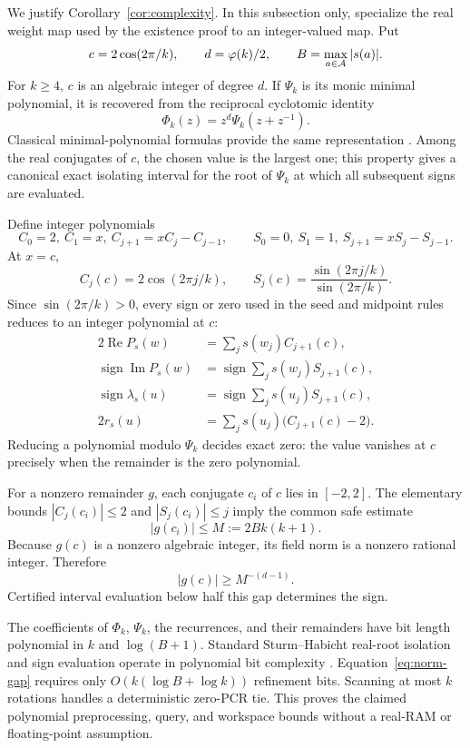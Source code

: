 We justify Corollary~\ref{cor:complexity}.  In this subsection only,
specialize the real weight map used by the existence proof to an
integer-valued map.  Put
\[
  c=2\cos(2\pi/k),\qquad d=\varphi(k)/2,
  \qquad B=\max_{a\in\mathcal A}|s(a)|.
\]
For $k\geq4$, $c$ is an algebraic integer of degree $d$.  If $\Psi_k$ is its
monic minimal polynomial, it is recovered from the reciprocal cyclotomic
identity
\begin{equation}
  \Phi_k(z)=z^d\Psi_k(z+z^{-1}).
  \label{eq:reciprocal-cyclotomic}
\end{equation}
Classical minimal-polynomial formulas provide the same representation
\cite{WatkinsZeitlin1993}.
Among the real conjugates of $c$, the chosen value is the largest one; this
property gives a canonical exact isolating interval for the root of
$\Psi_k$ at which all subsequent signs are evaluated.

Define integer polynomials
\[
  C_0=2,\ C_1=x,\ C_{j+1}=xC_j-C_{j-1},
  \qquad
  S_0=0,\ S_1=1,\ S_{j+1}=xS_j-S_{j-1}.
\]
At $x=c$,
\[
  C_j(c)=2\cos(2\pi j/k),
  \qquad
  S_j(c)=\frac{\sin(2\pi j/k)}{\sin(2\pi/k)}.
\]
Since $\sin(2\pi/k)>0$, every sign or zero used in the seed and midpoint
rules reduces to an integer polynomial at $c$:
\begin{align*}
  2\operatorname{Re}P_s(w)
    &=\sum_j s(w_j)C_{j+1}(c),\\
  \operatorname{sign}\operatorname{Im}P_s(w)
    &=\operatorname{sign}\sum_j s(w_j)S_{j+1}(c),\\
  \operatorname{sign}\lambda_s(u)
    &=\operatorname{sign}\sum_j s(u_j)S_{j+1}(c),\\
  2r_s(u)
    &=\sum_j s(u_j)\bigl(C_{j+1}(c)-2\bigr).
\end{align*}
Reducing a polynomial modulo $\Psi_k$ decides exact zero: the value vanishes
at $c$ precisely when the remainder is the zero polynomial.

For a nonzero remainder $g$, each conjugate $c_i$ of $c$ lies in $[-2,2]$.
The elementary bounds
$|C_j(c_i)|\leq2$ and $|S_j(c_i)|\leq j$ imply the common safe estimate
\[
  |g(c_i)|\leq M:=2Bk(k+1).
\]
Because $g(c)$ is a nonzero algebraic integer, its field norm is a nonzero
rational integer.  Therefore
\begin{equation}
  |g(c)|\geq M^{-(d-1)}.
  \label{eq:norm-gap}
\end{equation}
Certified interval evaluation below half this gap determines the sign.

The coefficients of $\Phi_k$, $\Psi_k$, the recurrences, and their remainders
have bit length polynomial in $k$ and $\log(B+1)$.  Standard
Sturm--Habicht real-root isolation and sign evaluation operate in polynomial
bit complexity \cite{EmirisTsigaridas2006}.  Equation~\eqref{eq:norm-gap}
requires only $O(k(\log B+\log k))$ refinement bits.  Scanning at most $k$
rotations handles a deterministic zero-PCR tie.  This proves the claimed
polynomial preprocessing, query, and workspace bounds without a real-RAM or
floating-point assumption.
